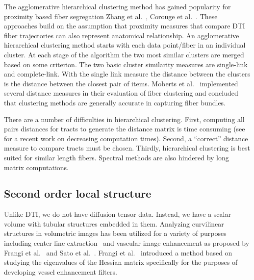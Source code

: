The agglomerative hierarchical clustering method \cite{DudaHartStork01} has gained popularity for proximity based fiber segregation Zhang et al.~\cite{Zhang2008}, Corouge et al.~\cite{Corouge2004}. 
These approaches build on the assumption that proximity measures that compare DTI fiber trajectories can also represent anatomical relationship. An agglomerative hierarchical clustering method starts with each data point/fiber in an individual cluster. At each stage of the algorithm the two most similar clusters are merged based on some criterion. The two basic cluster similarity measures are single-link and complete-link. With the single link measure the distance between the clusters is the distance between the closest pair of items. 
Moberts et al.~\cite{Moberts2005} implemented several distance measures in their evaluation of fiber clustering and concluded that clustering methods are generally accurate in capturing fiber bundles. 

There are a number of difficulties in hierarchical clustering. First, computing all pairs distances for tracts to generate the distance matrix is time consuming (see~\cite{Garyfallidis2012} for a recent work on decreasing computation times). Second, a ``correct'' distance measure to compare tracts must be chosen. Thirdly, hierarchical clustering is best suited for similar length fibers.
Spectral methods are also hindered by long matrix computations.


\subsection{Second order local structure}
Unlike DTI, we do not have diffusion tensor data. Instead, we have a scalar volume with tubular structures embedded in them. Analyzing curvilinear structures in volumetric images has been utilized for a variety of purposes including center line extraction~\cite{Bouix2005} and vascular image enhancement as proposed by Frangi et al.~\cite{Frangi1998} and Sato et al.~\cite{Sato1997}. Frangi et al.~\cite{Frangi1998} introduced a method based on studying the eigenvalues of the  Hessian matrix specifically for the purposes of developing vessel enhancement filters.


